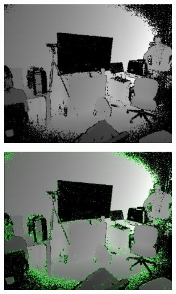 \begin{figure}[H]
	\centering
	\begin{subfigure}[b]{0.24\textwidth}
		\centering
		\includegraphics[width=\textwidth]{figures/resers_n.png}
		\caption{}
		\label{fig:resers:n}
	\end{subfigure}
	\hfill
	\begin{subfigure}[b]{0.24\textwidth}
		\centering
		\includegraphics[width=\textwidth]{figures/resers_o.png}
		\caption{}
		\label{fig:resers:o}
	\end{subfigure}

\end{figure}
